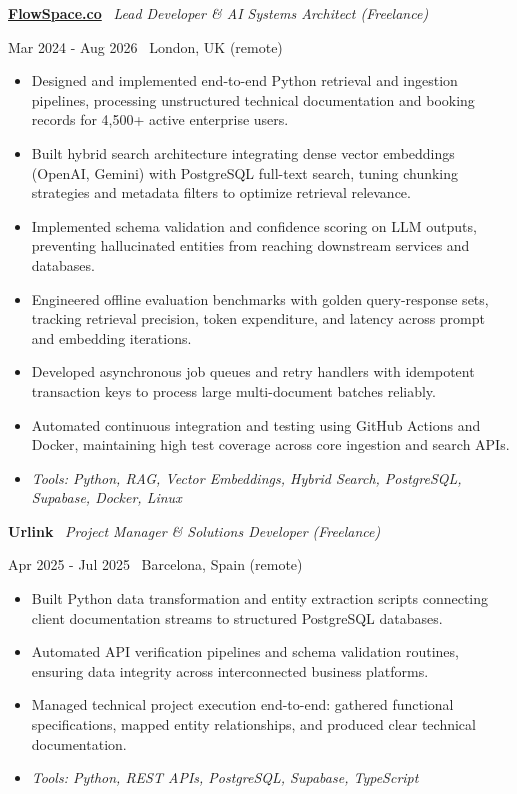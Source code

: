 \documentclass[a4paper,10pt]{article}
\newcommand{\role}[4]{%
 \vspace{2pt}\noindent
 \begin{minipage}[t]{0.70\textwidth}\raggedright\textbf{#1} \textbullet\ \textit{#3}\end{minipage}%
 \hfill
 \begin{minipage}[t]{0.28\textwidth}\raggedleft\footnotesize\color{gray}#2 \textbullet\ #4\end{minipage}%
 \vspace{1pt}%
}
\begin{document}
\role{\href{https://flowspace.co}{FlowSpace.co}}{Mar 2024 - Aug 2026}{Lead Developer \& AI Systems Architect (Freelance)}{London, UK (remote)}
\begin{itemize}
 \item Designed and implemented end-to-end Python retrieval and ingestion pipelines, processing unstructured technical documentation and booking records for 4,500+ active enterprise users.
 \item Built hybrid search architecture integrating dense vector embeddings (OpenAI, Gemini) with PostgreSQL full-text search, tuning chunking strategies and metadata filters to optimize retrieval relevance.
 \item Implemented schema validation and confidence scoring on LLM outputs, preventing hallucinated entities from reaching downstream services and databases.
 \item Engineered offline evaluation benchmarks with golden query-response sets, tracking retrieval precision, token expenditure, and latency across prompt and embedding iterations.
 \item Developed asynchronous job queues and retry handlers with idempotent transaction keys to process large multi-document batches reliably.
 \item Automated continuous integration and testing using GitHub Actions and Docker, maintaining high test coverage across core ingestion and search APIs.
 \item \textit{Tools: Python, RAG, Vector Embeddings, Hybrid Search, PostgreSQL, Supabase, Docker, Linux}
\end{itemize}

\role{Urlink}{Apr 2025 - Jul 2025}{Project Manager \& Solutions Developer (Freelance)}{Barcelona, Spain (remote)}
\begin{itemize}
 \item Built Python data transformation and entity extraction scripts connecting client documentation streams to structured PostgreSQL databases.
 \item Automated API verification pipelines and schema validation routines, ensuring data integrity across interconnected business platforms.
 \item Managed technical project execution end-to-end: gathered functional specifications, mapped entity relationships, and produced clear technical documentation.
 \item \textit{Tools: Python, REST APIs, PostgreSQL, Supabase, TypeScript}
\end{itemize}
\end{document}
